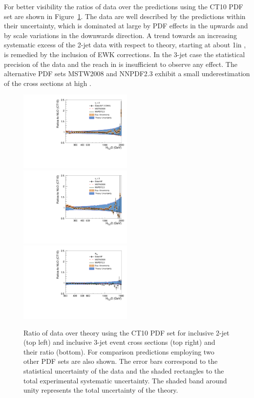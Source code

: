 For better visibility the ratios of data over the \NLOJETPP
predictions using the CT10 PDF set are shown in
Figure~\ref{fig:data_NLOPdfs}. The data are well described by the
predictions within their uncertainty, which is dominated at large
\httwo by PDF effects in the upwards and by scale variations in the
downwards direction. A trend towards an increasing systematic excess
of the 2-jet data with respect to theory, starting at about 1\TeV in
\httwo, is remedied by the inclusion of EWK corrections. In the 3-jet
case the statistical precision of the data and the reach in \httwo is
insufficient to observe any effect. The alternative PDF sets MSTW2008
and NNPDF2.3 exhibit a small underestimation of the cross sections at
high \httwo.

\begin{figure}[!htbp]
\begin{center}
  \includegraphics[width=0.5\textwidth]{Plots_HT_2_150/Comparison_data_NLO_Pdfs_2_EWK.pdf}%
  \includegraphics[width=0.5\textwidth]{Plots_HT_2_150/Comparison_data_NLO_Pdfs_3.pdf}\\
  \includegraphics[width=0.5\textwidth]{Plots_HT_2_150/Comparison_data_NLO_Pdfs_ratio_32.pdf}\\  
  \caption{Ratio of data over theory using the CT10 PDF set for
    inclusive 2-jet (top left) and inclusive 3-jet event cross
    sections (top right) and their ratio \ratio (bottom). For comparison predictions employing two
    other PDF sets are also shown. The error bars correspond to the
    statistical uncertainty of the data and the shaded rectangles to
    the total experimental systematic uncertainty. The shaded band
    around unity represents the total uncertainty of the theory.}
  \label{fig:data_NLOPdfs}
\end{center}  
\end{figure}


